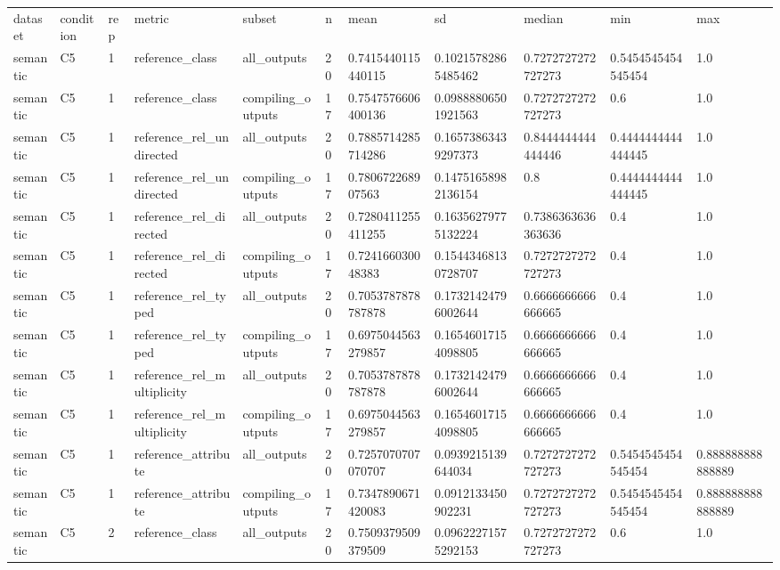 \begin{tabular}{lllllllllll}
dataset & condition & rep & metric & subset & n & mean & sd & median & min & max \\
semantic & C5 & 1 & reference\_class & all\_outputs & 20 & 0.7415440115440115 & 0.10215782865485462 & 0.7272727272727273 & 0.5454545454545454 & 1.0 \\
semantic & C5 & 1 & reference\_class & compiling\_outputs & 17 & 0.7547576606400136 & 0.09888806501921563 & 0.7272727272727273 & 0.6 & 1.0 \\
semantic & C5 & 1 & reference\_rel\_undirected & all\_outputs & 20 & 0.7885714285714286 & 0.16573863439297373 & 0.8444444444444446 & 0.4444444444444445 & 1.0 \\
semantic & C5 & 1 & reference\_rel\_undirected & compiling\_outputs & 17 & 0.780672268907563 & 0.14751658982136154 & 0.8 & 0.4444444444444445 & 1.0 \\
semantic & C5 & 1 & reference\_rel\_directed & all\_outputs & 20 & 0.7280411255411255 & 0.16356279775132224 & 0.7386363636363636 & 0.4 & 1.0 \\
semantic & C5 & 1 & reference\_rel\_directed & compiling\_outputs & 17 & 0.724166030048383 & 0.15443468130728707 & 0.7272727272727273 & 0.4 & 1.0 \\
semantic & C5 & 1 & reference\_rel\_typed & all\_outputs & 20 & 0.7053787878787878 & 0.17321424796002644 & 0.6666666666666665 & 0.4 & 1.0 \\
semantic & C5 & 1 & reference\_rel\_typed & compiling\_outputs & 17 & 0.6975044563279857 & 0.16546017154098805 & 0.6666666666666665 & 0.4 & 1.0 \\
semantic & C5 & 1 & reference\_rel\_multiplicity & all\_outputs & 20 & 0.7053787878787878 & 0.17321424796002644 & 0.6666666666666665 & 0.4 & 1.0 \\
semantic & C5 & 1 & reference\_rel\_multiplicity & compiling\_outputs & 17 & 0.6975044563279857 & 0.16546017154098805 & 0.6666666666666665 & 0.4 & 1.0 \\
semantic & C5 & 1 & reference\_attribute & all\_outputs & 20 & 0.7257070707070707 & 0.0939215139644034 & 0.7272727272727273 & 0.5454545454545454 & 0.888888888888889 \\
semantic & C5 & 1 & reference\_attribute & compiling\_outputs & 17 & 0.7347890671420083 & 0.0912133450902231 & 0.7272727272727273 & 0.5454545454545454 & 0.888888888888889 \\
semantic & C5 & 2 & reference\_class & all\_outputs & 20 & 0.7509379509379509 & 0.09622271575292153 & 0.7272727272727273 & 0.6 & 1.0 \\

\end{tabular}
